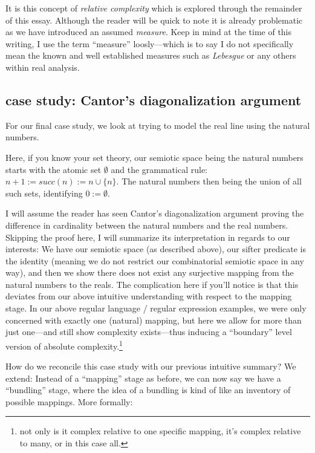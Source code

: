 \documentclass[twoside]{article}
\begin{document}
It is this concept of \emph{relative complexity} which is explored through the remainder of this essay. Although the reader will
be quick to note it is already problematic as we have introduced an assumed \emph{measure}. Keep in mind at the time of this writing,
I use the term ``measure'' loosly---which is to say I do not specifically mean the known and well established measures such
as \emph{Lebesgue} or any others within real analysis.

\subsection*{case study: Cantor's diagonalization argument}

For our final case study, we look at trying to model the real line using the natural numbers.

Here, if you know your set theory, our semiotic space being the natural numbers starts with the atomic set $ \emptyset $
and the grammatical rule: $ n+1:=succ(n):=n\cup\{n\} $. The natural numbers then being the union of all such sets, identifying
$ 0:=\emptyset $.

I will assume the reader has seen Cantor's diagonalization argument proving the difference in cardinality between the natural
numbers and the real numbers. Skipping the proof here, I will summarize its interpretation in regards to our interests:
We have our semiotic space (as described above), our sifter predicate is the identity (meaning we do not restrict our combinatorial
semiotic space in any way), and then we show there does not exist any surjective mapping from the natural numbers to the reals.
The complication here if you'll notice is that this deviates from our above intuitive understanding with respect to the mapping
stage. In our above regular language / regular expression examples, we were only concerned with exactly one (natural) mapping,
but here we allow for more than just one---and still show complexity exists---thus inducing a ``boundary'' level version of
absolute complexity.\footnote{not only is it complex relative to one specific mapping, it's complex relative to many,
or in this case all.}

How do we reconcile this case study with our previous intuitive summary? We extend: Instead of a ``mapping'' stage as before,
we can now say we have a ``bundling'' stage, where the idea of a bundling is kind of like an inventory of possible mappings.
More formally:
\end{document}
